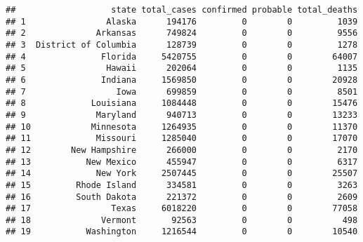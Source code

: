 \documentclass[
]{article}
\newenvironment{Shaded}{\begin{snugshade}}{\end{snugshade}}
\newcommand{\DecValTok}[1]{\textcolor[rgb]{0.00,0.00,0.81}{#1}}
\newcommand{\FunctionTok}[1]{\textcolor[rgb]{0.00,0.00,0.00}{#1}}
\newcommand{\NormalTok}[1]{#1}
\newcommand{\SpecialCharTok}[1]{\textcolor[rgb]{0.00,0.00,0.00}{#1}}
\begin{document}
\begin{Shaded}
\end{Shaded}

\begin{verbatim}
##                   state total_cases confirmed probable total_deaths
## 1                Alaska      194176         0        0         1039
## 2              Arkansas      749824         0        0         9556
## 3  District of Columbia      128739         0        0         1278
## 4               Florida     5420755         0        0        64007
## 5                Hawaii      202064         0        0         1135
## 6               Indiana     1569850         0        0        20928
## 7                  Iowa      699859         0        0         8501
## 8             Louisiana     1084448         0        0        15476
## 9              Maryland      940713         0        0        13233
## 10            Minnesota     1264935         0        0        11370
## 11             Missouri     1285040         0        0        17070
## 12        New Hampshire      266000         0        0         2170
## 13           New Mexico      455947         0        0         6317
## 14             New York     2507445         0        0        25507
## 15         Rhode Island      334581         0        0         3263
## 16         South Dakota      221372         0        0         2609
## 17                Texas     6018220         0        0        77058
## 18              Vermont       92563         0        0          498
## 19           Washington     1216544         0        0        10540
\end{verbatim}
\end{document}
